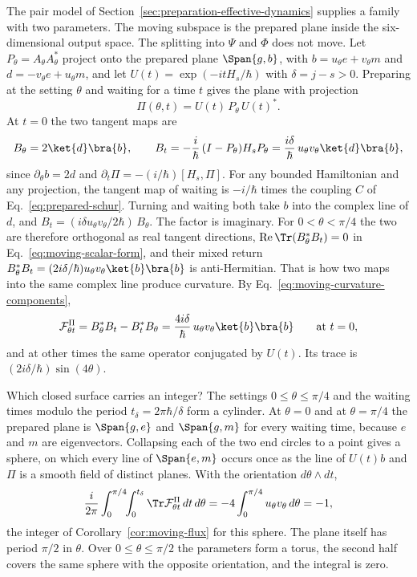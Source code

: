 The pair model of Section~\ref{sec:preparation-effective-dynamics} supplies a family with two parameters. The moving subspace is the prepared plane inside the six-dimensional output space. The splitting into $\Psi$ and $\Phi$ does not move. Let $P_\theta=A_\theta A_\theta^*$ project onto the prepared plane $\Span\{g,b\}$, with $b=u_\theta e+v_\theta m$ and $d=-v_\theta e+u_\theta m$, and let $U(t)=\exp(-itH_s/\hbar)$ with $\delta=j-s>0$. Preparing at the setting $\theta$ and waiting for a time $t$ gives the plane with projection
\begin{equation}
 \Pi(\theta,t)=U(t)\,P_\theta\,U(t)^* .
 \label{eq:moving-pair-family}
\end{equation}
At $t=0$ the two tangent maps are
\begin{equation}
 B_\theta=2\ket{d}\bra{b},\qquad
 B_t=-\frac{i}{\hbar}\,(I-P_\theta)H_sP_\theta=\frac{i\delta}{\hbar}\,u_\theta v_\theta\ket{d}\bra{b},
 \label{eq:moving-pair-tangents}
\end{equation}
since $\partial_\theta b=2d$ and $\partial_t\Pi=-(i/\hbar)[H_s,\Pi]$. For any bounded Hamiltonian and any projection, the tangent map of waiting is $-i/\hbar$ times the coupling $C$ of Eq.~\eqref{eq:prepared-schur}. Turning and waiting both take $b$ into the complex line of $d$, and $B_t=(i\delta u_\theta v_\theta/2\hbar)\,B_\theta$. The factor is imaginary. For $0<\theta<\pi/4$ the two are therefore orthogonal as real tangent directions, $\operatorname{Re}\Tr(B_\theta^*B_t)=0$ in Eq.~\eqref{eq:moving-scalar-form}, and their mixed return $B_\theta^*B_t=(2i\delta/\hbar)u_\theta v_\theta\ket{b}\bra{b}$ is anti-Hermitian. That is how two maps into the same complex line produce curvature. By Eq.~\eqref{eq:moving-curvature-components},
\begin{equation}
 \mathcal F^\Pi_{\theta t}=B_\theta^*B_t-B_t^*B_\theta=\frac{4i\delta}{\hbar}\,u_\theta v_\theta\ket{b}\bra{b}
 \qquad\text{at }t=0 ,
 \label{eq:moving-pair-curvature}
\end{equation}
and at other times the same operator conjugated by $U(t)$. Its trace is $(2i\delta/\hbar)\sin(4\theta)$.

Which closed surface carries an integer? The settings $0\le\theta\le\pi/4$ and the waiting times modulo the period $t_\delta=2\pi\hbar/\delta$ form a cylinder. At $\theta=0$ and at $\theta=\pi/4$ the prepared plane is $\Span\{g,e\}$ and $\Span\{g,m\}$ for every waiting time, because $e$ and $m$ are eigenvectors. Collapsing each of the two end circles to a point gives a sphere, on which every line of $\Span\{e,m\}$ occurs once as the line of $U(t)b$ and $\Pi$ is a smooth field of distinct planes. With the orientation $d\theta\wedge dt$,
\begin{equation}
 \frac{i}{2\pi}\int_0^{\pi/4}\!\!\int_0^{t_\delta}\Tr\mathcal F^\Pi_{\theta t}\,dt\,d\theta
   =-4\int_0^{\pi/4}u_\theta v_\theta\,d\theta=-1 ,
 \label{eq:moving-pair-flux}
\end{equation}
the integer of Corollary~\ref{cor:moving-flux} for this sphere. The plane itself has period $\pi/2$ in $\theta$. Over $0\le\theta\le\pi/2$ the parameters form a torus, the second half covers the same sphere with the opposite orientation, and the integral is zero.

